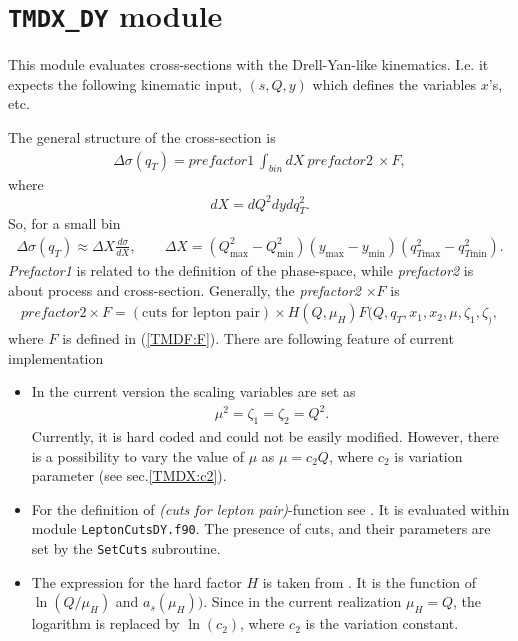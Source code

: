 \documentclass[prd,nofootinbib,eqsecnum,final]{revtex4}
\renewcommand{\(}{\left(}
\renewcommand{\)}{\right)}
\renewcommand{\[}{\left[}
\renewcommand{\]}{\right]}
\begin{document}
\newpage
\section{\texttt{TMDX{\_}DY} module}
\label{TMDX}

This module evaluates cross-sections with the Drell-Yan-like kinematics. I.e. it expects the following kinematic input, $(s,Q,y)$ which defines the variables $x$'s, etc.

The general structure of the cross-section is
\begin{eqnarray}
\Delta\sigma(q_T)=prefactor1~\int_{bin} dX ~prefactor2~\times F,
\end{eqnarray}
where $$dX=dQ^2 dy d q^2_T.$$ So, for a small bin
\begin{eqnarray}
\Delta\sigma(q_T)\approx\Delta X \frac{d\sigma}{dX},\qquad \Delta X=(Q_{\text{max}}^2-Q_{\text{min}}^2)(y_{\text{max}}-y_{\text{min}})(q_{T\text{max}}^2-q_{T\text{min}}^2).
\end{eqnarray}
\textit{Prefactor1} is related to the definition of the phase-space, while \textit{prefactor2} is about process and cross-section. Generally, the \textit{prefactor2} $\times F$ is
\begin{eqnarray}
prefactor2 \times F=(\text{cuts for lepton pair})\times H(Q,\mu_H)F(Q,q_T,x_1,x_2,\mu,\zeta_1,\zeta_),
\end{eqnarray}
where $F$ is defined in (\ref{TMDF:F}). There are following feature of current implementation
\begin{itemize}
\item In the current version the scaling variables are set as
\begin{eqnarray}
\mu^2=\zeta_1=\zeta_2=Q^2.
\end{eqnarray}
Currently, it is hard coded and could not be easily modified. However, there is a possibility to vary the value of $\mu$ as $\mu=c_2 Q$, where $c_2$ is variation parameter (see sec.\ref{TMDX:c2}).
\item For the definition of \textit{(cuts for lepton pair)}-function see \cite{Scimemi:2017etj}. It is evaluated within module \texttt{LeptonCutsDY.f90}. The presence of cuts, and their parameters are set by the \texttt{SetCuts} subroutine.
\item The expression for the hard factor $H$ is taken from \cite{Gehrmann:2010ue}. It is the function of $\ln(Q/\mu_H)$ and $a_s(\mu_H))$. Since in the current realization $\mu_H=Q$, the logarithm is replaced by $\ln(c_2)$, where $c_2$ is the variation constant.
\end{itemize}
\end{document}
